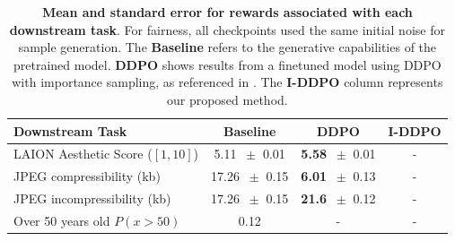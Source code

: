 \begin{table}\label{tab:reward-results}
\centering
\begin{tabular}{lccc}
\toprule
\textbf{Downstream Task} & \textbf{Baseline} & \textbf{DDPO} & \textbf{I-DDPO}\\
\midrule
LAION Aesthetic Score ($[1,10]$) & 5.11 $~\pm$ 0.01 & \textbf{5.58} $~\pm$ 0.01 & - \\
JPEG compressibility (kb) & 17.26 $~\pm$  0.15 & \textbf{6.01} $~\pm$ 0.13  & -\\
JPEG incompressibility (kb) & 17.26 $~\pm$ 0.15 & \textbf{21.6} $~\pm$ 0.12 & - \\
Over 50 years old $P(x>\text{50})$ & 0.12 & - & - \\
\bottomrule
\end{tabular}
\captionsetup{width=\textwidth} %
\caption{\textbf{Mean and standard error for rewards associated with each downstream task}. For fairness, all checkpoints used the same initial noise for sample generation. The \textbf{Baseline} refers to the generative capabilities of the pretrained model. \textbf{DDPO} shows results from a finetuned model using DDPO with importance sampling, as referenced in \cite{black2023training}. The \textbf{I-DDPO} column represents our proposed method.}
\end{table}




